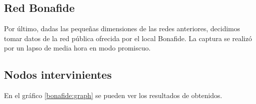 


\newpage
\subsection{Red Bonafide}
 Por último, dadas las peque\~nas dimensiones de las redes anteriores, decidimos tomar datos de la red pública ofrecida por el local Bonafide. La captura se realizó por un lapso de media hora en modo promiscuo.

\subsection{Nodos intervinientes}

En el gráfico \ref{bonafide:graph} se pueden ver los resultados de obtenidos.

